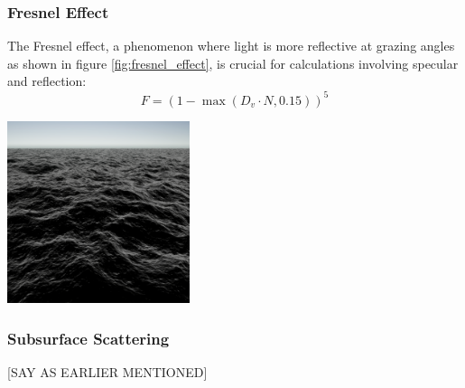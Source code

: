 \subsubsection{Fresnel Effect}
The Fresnel effect, a phenomenon where light is more reflective at grazing angles as shown in figure \ref{fig:fresnel_effect}, is crucial for calculations involving specular and reflection:
\begin{equation}
    F = (1 - \max(D_v \cdot N, 0.15))^{5}
\end{equation}
\begin{minipage}{1\textwidth}
    \centering
    \includegraphics[width=0.40\textwidth]{"images/fresnel.png"}
    \label{fig:fresnel_effect}
\end{minipage}

\subsubsection{Subsurface Scattering}

[SAY AS EARLIER MENTIONED]

